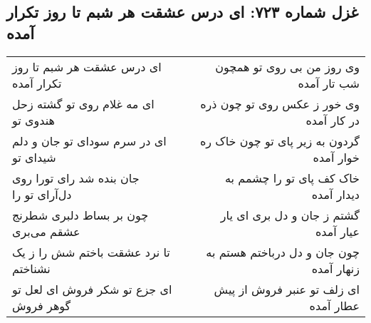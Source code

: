 \begin{center}
\section*{غزل شماره ۷۲۳: ای درس عشقت هر شبم تا روز تکرار آمده}
\label{sec:723}
\begin{longtable}{l p{0.5cm} r}
ای درس عشقت هر شبم تا روز تکرار آمده
&&
وی روز من بی روی تو همچون شب تار آمده
\\
ای مه غلام روی تو گشته زحل هندوی تو
&&
وی خور ز عکس روی تو چون ذره در کار آمده
\\
ای در سرم سودای تو جان و دلم شیدای تو
&&
گردون به زیر پای تو چون خاک ره خوار آمده
\\
جان بنده شد رای تورا روی دل‌آرای تو را
&&
خاک کف پای تو را چشمم به دیدار آمده
\\
چون بر بساط دلبری شطرنج عشقم می‌بری
&&
گشتم ز جان و دل بری ای یار عیار آمده
\\
تا نرد عشقت باختم شش را ز یک نشناختم
&&
چون جان و دل درباختم هستم به زنهار آمده
\\
ای جزع تو شکر فروش ای لعل تو گوهر فروش
&&
ای زلف تو عنبر فروش از پیش عطار آمده
\\
\end{longtable}
\end{center}
